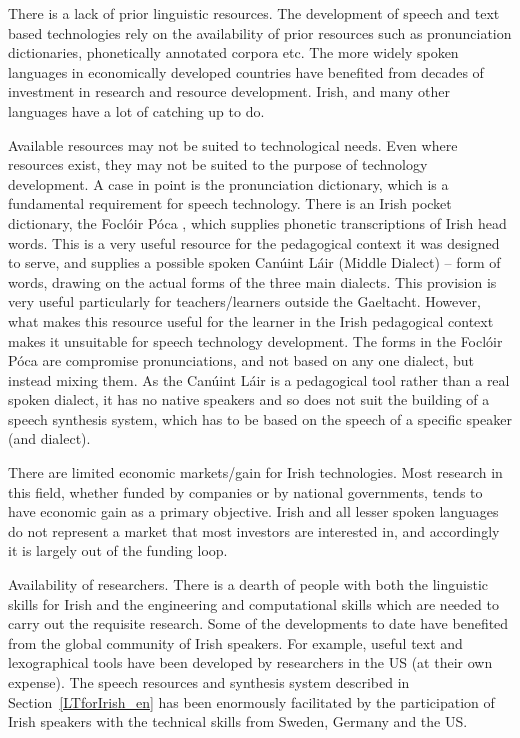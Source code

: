 \begin{multicols}{2}
There is a lack of prior linguistic resources. The development of speech and text based technologies rely on the availability of prior resources such as pronunciation dictionaries, phonetically annotated corpora etc. The more widely spoken languages in economically developed countries have benefited from decades of investment in research and resource development. Irish, and many other languages have a lot of catching up to do.

Available resources may not be suited to technological needs. Even where resources exist, they may not be suited to the purpose of technology development. A case in point is the pronunciation dictionary, which is a fundamental requirement for speech technology. There is an Irish pocket dictionary, the Foclóir Póca \cite{focloir}, which supplies phonetic transcriptions of Irish head words. This is a very useful resource for the pedagogical context it was designed to serve, and supplies a possible spoken Canúint Láir (Middle Dialect) -- form of words, drawing on the actual forms of the three main dialects. This provision is very useful particularly for teachers/learners outside the Gaeltacht. However, what makes this resource useful for the learner in the Irish pedagogical context makes it unsuitable for speech technology development. The forms in the Foclóir Póca are compromise pronunciations, and not based on any one dialect, but instead mixing them. As the Canúint Láir is a pedagogical tool rather than a real spoken dialect, it has no native speakers and so does not suit the building of a speech synthesis system, which has to be based on the speech of a specific speaker (and dialect).

There are limited economic markets/gain for Irish technologies. Most research in this field, whether funded by companies or by national governments, tends to have economic gain as a primary objective.  Irish and all lesser spoken languages do not represent a market that most investors are interested in, and accordingly it is largely out of the funding loop.

Availability of researchers. There is a dearth of people with both the linguistic skills for Irish and the engineering and computational skills which are needed to carry out the requisite research.  Some of the developments to date have benefited from the global community of Irish speakers. For example, useful text and lexographical tools have been developed by researchers in the US (at their own expense). The speech resources and synthesis system described in Section~\ref{LTforIrish_en} has been enormously facilitated by the participation of Irish speakers with the technical skills from Sweden, Germany and the US.


\end{multicols}
